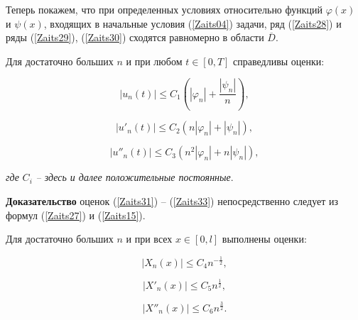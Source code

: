 Теперь покажем, что при определенных условиях относительно функций $\varphi(x)$ и $\psi(x)$, входящих в начальные условия (\ref{Zaits04}) задачи, ряд (\ref{Zaits28}) и ряды (\ref{Zaits29}), (\ref{Zaits30}) сходятся равномерно в области $\overline{D}$.



\begin{lemma}[1]

Для достаточно больших $n$ и при любом $t\in[0,T]$ справедливы оценки:

\begin{equation}

\label{Zaits31}

|u_n(t)|\leq C_1\left(|\varphi_n|+\frac{|\psi_n|}{n}\right),

\end{equation}

\begin{equation}

\label{Zaits32}

|u'_n(t)|\leq C_2\left(n|\varphi_n|+|\psi_n|\right),

\end{equation}

\begin{equation}

\label{Zaits33}

|u''_n(t)|\leq C_3\left(n^2|\varphi_n|+n|\psi_n|\right),

\end{equation}

{\it где} $C_i$ {\it -- здесь и далее положительные постоянные}.

\end{lemma}



\textbf{Доказательство} оценок (\ref{Zaits31}) -- (\ref{Zaits33}) непосредственно следует из формул (\ref{Zaits27}) и (\ref{Zaits15}).



\begin{lemma}[2]

Для достаточно больших $n$ и при всех $x\in[0,l]$ выполнены оценки:

\begin{equation}

\label{Zaits34}

|X_n(x)|\leq C_4n^{-\frac12},

\end{equation}

\begin{equation}

\label{Zaits35}

|X'_n(x)|\leq C_5n^{\frac12},

\end{equation}

\begin{equation}

\label{Zaits36}

|X''_n(x)|\leq C_6n^{\frac32}.

\end{equation}

\end{lemma}



